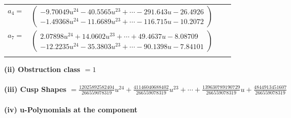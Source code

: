 \documentclass[1p]{elsarticle_modified}
\theoremstyle{definition}
\begin{document}
\begin{tabular}{m{7pt} m{180pt} m{7pt} m{180pt} }
\flushright $a_{4}=$&$\begin{pmatrix}-9.70049 u^{24}-40.5565 u^{23}+\cdots-291.643 u-26.4926\\-1.49368 u^{24}-11.6689 u^{23}+\cdots-116.715 u-10.2072\end{pmatrix}$ \\
\flushright $a_{7}=$&$\begin{pmatrix}2.07898 u^{24}+14.0602 u^{23}+\cdots+49.4637 u-8.08709\\-12.2235 u^{24}-35.3803 u^{23}+\cdots-90.1398 u-7.84101\end{pmatrix}$\\&\end{tabular}
\flushleft \textbf{(ii) Obstruction class $= 1$}\\~\\
\flushleft \textbf{(iii) Cusp Shapes $= \frac{12025892582404}{266559078319} u^{24}+\frac{41146040688402}{266559078319} u^{23}+\cdots+\frac{139630789190729}{266559078319} u+\frac{4844913451607}{266559078319}$}\\~\\
\newpage\renewcommand{\arraystretch}{1}
\flushleft \textbf{(iv) u-Polynomials at the component}\newline \\
\end{document}
